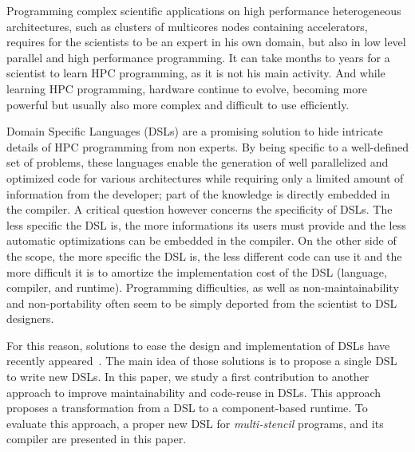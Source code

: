 Programming complex scientific applications on high performance heterogeneous architectures, such as clusters of multicores nodes containing accelerators, requires for the scientists to be an expert in his own domain, but also in low level parallel and high performance programming. It can take months to years for a scientist to learn HPC programming, as it is not his main activity. And while learning HPC programming, hardware continue to evolve, becoming more powerful but usually also more  complex and difficult to use efficiently.

Domain Specific Languages (DSLs) are a promising solution to hide intricate details of HPC programming from non experts.
By being specific to a well-defined set of problems, these languages enable the generation of well parallelized and optimized code for various architectures while requiring only a limited amount of information from the developer; part of the knowledge is directly embedded in the compiler.
A critical question however concerns the specificity of DSLs.
The less specific the DSL is, the more informations its users must provide and the less automatic optimizations can be embedded in the compiler.
On the other side of the scope, the more specific the DSL is, the less different code can use it and the more difficult it is to amortize the implementation cost of the DSL (language, compiler, and runtime).
Programming difficulties, as well as non-maintainability and non-portability often seem to be simply deported from the scientist to DSL designers.

For this reason, solutions to ease the design and implementation of DSLs have recently appeared~\cite{Fernandez:2014:DFL:2691166.2691168}. The main idea of those solutions is to propose a single DSL to write new DSLs. In this paper, we study a first contribution to another approach to improve maintainability and code-reuse in DSLs. This approach proposes a transformation from a DSL to a component-based runtime.
To evaluate this approach, a proper new DSL for \emph{multi-stencil} programs, and its compiler are presented in this paper.

